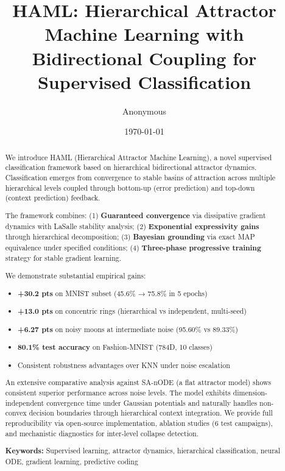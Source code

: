 \documentclass[11pt,a4paper]{article}
\title{HAML: Hierarchical Attractor Machine Learning with Bidirectional Coupling for Supervised Classification}
\author{Anonymous}
\affil{arXiv Preprint}
\date{\today}
\begin{document}
\maketitle

\begin{abstract}
We introduce HAML (Hierarchical Attractor Machine Learning), a novel supervised classification framework based on hierarchical bidirectional attractor dynamics. Classification emerges from convergence to stable basins of attraction across multiple hierarchical levels coupled through bottom-up (error prediction) and top-down (context prediction) feedback. 

The framework combines:
(1) \textbf{Guaranteed convergence} via dissipative gradient dynamics with LaSalle stability analysis;
(2) \textbf{Exponential expressivity gains} through hierarchical decomposition;
(3) \textbf{Bayesian grounding} via exact MAP equivalence under specified conditions;
(4) \textbf{Three-phase progressive training} strategy for stable gradient learning.

We demonstrate substantial empirical gains:
\begin{itemize}
  \item \textbf{+30.2 pts} on MNIST subset (45.6\% → 75.8\% in 5 epochs)
  \item \textbf{+13.0 pts} on concentric rings (hierarchical vs independent, multi-seed)
  \item \textbf{+6.27 pts} on noisy moons at intermediate noise (95.60\% vs 89.33\%)
  \item \textbf{80.1\% test accuracy} on Fashion-MNIST (784D, 10 classes)
  \item Consistent robustness advantages over KNN under noise escalation
\end{itemize}

An extensive comparative analysis against SA-nODE (a flat attractor model) shows consistent superior performance across noise levels. The model exhibits dimension-independent convergence time under Gaussian potentials and naturally handles non-convex decision boundaries through hierarchical context integration. We provide full reproducibility via open-source implementation, ablation studies (6 test campaigns), and mechanistic diagnostics for inter-level collapse detection.

\textbf{Keywords:} Supervised learning, attractor dynamics, hierarchical classification, neural ODE, gradient learning, predictive coding

\end{abstract}
\end{document}
